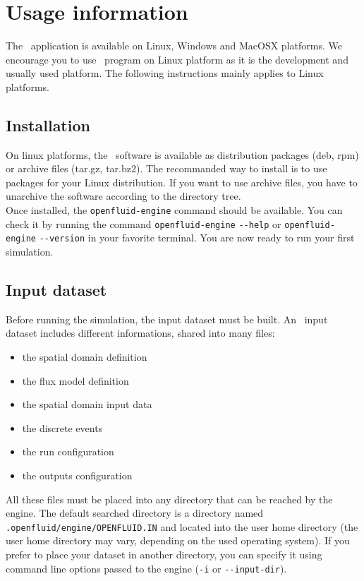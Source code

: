 \chapter{Usage information}

The \OFEname \ application is available on Linux, Windows and MacOSX platforms.
We encourage you to use \OFEname \ program on Linux platform as it is the development and usually used platform. The following instructions mainly applies to Linux platforms.   

\section{Installation}

On linux platforms, the \OFEname \ software is available as distribution packages (deb, rpm) or archive files (tar.gz, tar.bz2).  
The recommanded way to install is to use packages for your Linux distribution. If you want to use archive files, you have to unarchive the software according to the directory tree.\\
Once installed, the \texttt{openfluid-engine} command should be available. You can check it by running the command \texttt{openfluid-engine} \verb?--?\texttt{help} or \texttt{openfluid-engine} \verb?--?\texttt{version} in your favorite terminal. You are now ready to run your first simulation.  

\section{Input dataset}

Before running the simulation, the input dataset must be built.
An \OFEname \ input dataset includes different informations, shared into many files:
\begin{itemize}
  \item the spatial domain definition
  \item the flux model definition
  \item the spatial domain input data 
  \item the discrete events
  \item the run configuration
  \item the outputs configuration
\end{itemize}

\noindent All these files must be placed into any directory that can be reached by the
engine. The default searched directory is a directory named
\texttt{.openfluid/engine/OPENFLUID.IN} and located into the user home
directory (the user home directory may vary, depending on the used operating
system). If you prefer to place your dataset in another directory, you can
specify it using command line options passed to the engine (\texttt{-i} or \verb?--?\texttt{input-dir}).\\

